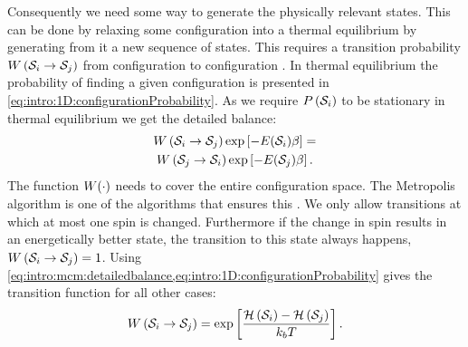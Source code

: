 Consequently we need some way to generate the physically relevant states. This can be done by relaxing some configuration into a thermal equilibrium by generating from it a new sequence of states. This requires a transition probability $W\left(\mathcal{S}_{i} \to \mathcal{S}_{j} \right)$ from configuration  to configuration . In thermal equilibrium the probability of finding a given configuration is presented in \cref{eq:intro:1D:configurationProbability}. As we require $P\left(\mathcal{S}_{i}\right)$ to be stationary in thermal equilibrium we get the detailed balance:
\begin{multline}\label{eq:intro:mcm:detailedbalance}
	W\left(\mathcal{S}_{i} \to \mathcal{S}_{j}\right)\exp\left[-E(\mathcal{S}_{i})\beta \right] = \\
	W\left(\mathcal{S}_{j} \to \mathcal{S}_{i}\right)\exp\left[-E(\mathcal{S}_{j})\beta \right].
\end{multline}
The function $W(\cdot)$ needs to cover the entire configuration space. The Metropolis algorithm is one of the algorithms that ensures this \cite{kenzel1997physics}. We only allow transitions at which at most one spin is changed. Furthermore if the change in spin results in an energetically better state, the transition to this state always happens, \ie $W\left(\mathcal{S}_{i} \to \mathcal{S}_{j}\right) = 1$. Using \cref{eq:intro:mcm:detailedbalance,eq:intro:1D:configurationProbability} gives the transition function for all other cases:
	\begin{equation}
		W\left(\mathcal{S}_{i} \to \mathcal{S}_{j}\right) = \exp \left[\frac{\mathcal{H}\left(\mathcal{S}_{i}\right) - \mathcal{H}\left(\mathcal{S}_{j}\right)}{k_b T}\right].
	\end{equation}

